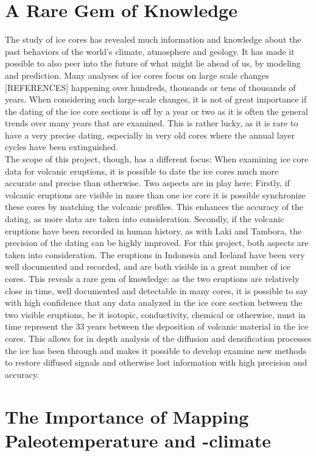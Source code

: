 \documentclass[../../CompleteThesis/Complete_1stDraft]{subfiles}
\begin{document}
\section[A Rare Gem]{A Rare Gem of Knowledge}
The study of ice cores has revealed much information and knowledge about the past behaviors of the world's climate, atmosphere and geology. It has made it possible to also peer into the future of what might lie ahead of us, by modeling and prediction. Many analyses of ice cores focus on large scale changes [REFERENCES] happening over hundreds, thousands or tens of thousands of years. When considering such large-scale changes, it is not of great importance if the dating of the ice core sections is off by a year or two as it is often the general trends over many years that are examined. This is rather lucky, as it is rare to have a very precise dating, especially in very old cores where the annual layer cycles have been extinguished. \\
The scope of this project, though, has a different focus: When examining ice core data for volcanic eruptions, it is possible to date the ice cores much more accurate and precise than otherwise. Two aspects are in play here: Firstly, if volcanic eruptions are visible in more than one ice core it is possible synchronize these cores by matching the volcanic profiles. This enhances the accuracy of the dating, as more data are taken into consideration. Secondly, if the volcanic eruptions have been recorded in human history, as with Laki and Tambora, the precision of the dating can be highly improved. For this project, both aspects are taken into consideration. The eruptions in Indonesia and Iceland have been very well documented and recorded, and are both visible in a great number of ice cores. This reveals a rare gem of knowledge: as the two eruptions are relatively close in time, well documented and detectable in many cores, it is possible to say with high confidence that any data analyzed in the ice core section between the two visible eruptions, be it isotopic, conductivity, chemical or otherwise, must in time represent the 33 years between the deposition of volcanic material in the ice cores. This allows for in depth analysis of the diffusion and densification processes the ice has been through and makes it possible to develop examine new methods to restore diffused signals and otherwise lost information with high precision and accuracy.
\section[Paleotemperature and -climate]{The Importance of Mapping Paleotemperature and -climate}
\end{document}
